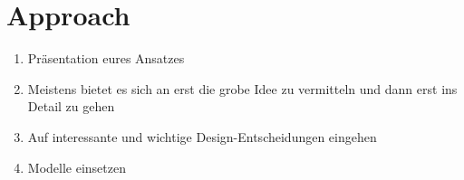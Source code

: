 \section{Approach}

\begin{enumerate}
	\item Präsentation eures Ansatzes
	\item Meistens bietet es sich an erst die grobe Idee zu vermitteln und dann erst ins Detail zu gehen
	\item Auf interessante und wichtige Design-Entscheidungen eingehen
	\item Modelle einsetzen
\end{enumerate}
